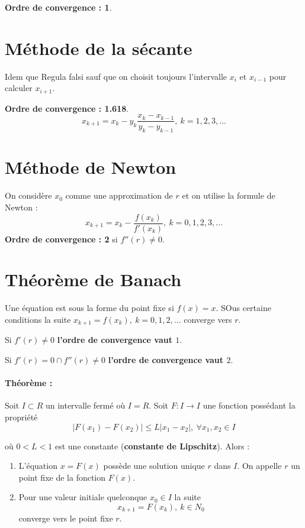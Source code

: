 \documentclass[a4paper,9pt]{extarticle}
\begin{document}
\begin{multicols*}{2}
\textbf{Ordre de convergence : 1}.

\section{Méthode de la sécante}

Idem que Regula falsi sauf que on choisit toujours l'intervalle $x_i$ et $x_{i-1}$ pour calculer $x_{i+1}$.

\textbf{Ordre de convergence : 1.618}.
$$
x_{k+1}=x_k-y_k\frac{x_k-x_{k-1}}{y_k-y_{k-1}},\ k=1,2,3,...
$$

\section{Méthode de Newton}

On considère $x_0$ comme une approximation de $r$ et on utilise la formule de Newton :
$$
x_{k+1}=x_k-\frac{f(x_k)}{f'(x_k)},\ k=0,1,2,3,...
$$
\textbf{Ordre de convergence : 2} si $f''(r)\neq 0$.

\section{Théorème de Banach}

Une équation est sous la forme du point fixe si $f(x)=x$. SOus certaine conditions la suite $x_{k+1}=f(x_k),\ k=0,1,2,...$ converge vers $r$.

Si $f'(r)\neq 0$ \textbf{l'ordre de convergence vaut $1$}.

Si $f'(r)=0 \cap f''(r)\neq 0$ \textbf{l'ordre de convergence vaut $2$}.

\paragraph*{Théorème :} Soit $I\subset R$ un intervalle fermé où $I=R$. Soit $F:I\rightarrow I$ une fonction possédant la propriété
$$
|F(x_1)-F(x_2)| \leq L|x_1-x_2|,\ \forall x_1,x_2\in I
$$

où $0 < L < 1$ est une constante (\textbf{constante de Lipschitz}). Alors :
\begin{enumerate}
    \item L'équation $x=F(x)$ possède une solution unique $r$ dans $I$. On appelle $r$ un point fixe de la fonction $F(x)$.
    \item Pour une valeur initiale quelconque $x_0\in I$ la suite
    $$
    x_{k+1}=F(x_k), \ k\in N_0
    $$
    converge vers le point fixe $r$.
\end{enumerate}


\end{multicols*}
\end{document}
